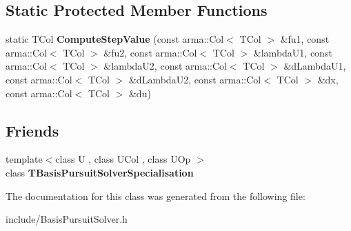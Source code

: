 \subsection*{Static Protected Member Functions}
\begin{DoxyCompactItemize}
\item 
static T\+Col {\bfseries Compute\+Step\+Value} (const arma\+::\+Col$<$ T\+Col $>$ \&fu1, const arma\+::\+Col$<$ T\+Col $>$ \&fu2, const arma\+::\+Col$<$ T\+Col $>$ \&lambda\+U1, const arma\+::\+Col$<$ T\+Col $>$ \&lambda\+U2, const arma\+::\+Col$<$ T\+Col $>$ \&d\+Lambda\+U1, const arma\+::\+Col$<$ T\+Col $>$ \&d\+Lambda\+U2, const arma\+::\+Col$<$ T\+Col $>$ \&dx, const arma\+::\+Col$<$ T\+Col $>$ \&du)\hypertarget{classkl1p_1_1TBasisPursuitSolver_a59d51c64c9062dddbd444e06a8c3937f}{}\label{classkl1p_1_1TBasisPursuitSolver_a59d51c64c9062dddbd444e06a8c3937f}

\end{DoxyCompactItemize}
\subsection*{Friends}
\begin{DoxyCompactItemize}
\item 
{\footnotesize template$<$class U , class U\+Col , class U\+Op $>$ }\\class {\bfseries T\+Basis\+Pursuit\+Solver\+Specialisation}\hypertarget{classkl1p_1_1TBasisPursuitSolver_ab1c111a48736ffa667f87545df6cc15d}{}\label{classkl1p_1_1TBasisPursuitSolver_ab1c111a48736ffa667f87545df6cc15d}

\end{DoxyCompactItemize}


The documentation for this class was generated from the following file\+:\begin{DoxyCompactItemize}
\item 
include/Basis\+Pursuit\+Solver.\+h\end{DoxyCompactItemize}
